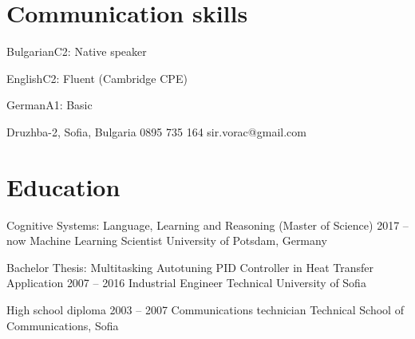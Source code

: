 \documentclass{tccv}
\begin{document}
\section{Communication skills}
\begin{factlist}
\item{Bulgarian}{C2: Native speaker}
\item{English}{C2: Fluent (Cambridge CPE)}
\item{German}{A1: Basic}
\end{factlist}


\personal
    {Druzhba-2, Sofia, Bulgaria}
    {0895 735 164}
    {sir.vorac@gmail.com}


\section{Education}
\begin{yearlist}
\item[{\footnotesize Cognitive Systems: Language, Learning and Reasoning
(Master of
Science)}]
     {2017 -- now}
     {Machine Learning Scientist}
     {University of Potsdam, Germany}

\item[Bachelor Thesis:                 \newline
     {\footnotesize Multitasking Autotuning PID Controller in Heat Transfer Application}]
     {2007 -- 2016}
     {Industrial Engineer}
     {Technical University of Sofia}

\item[High school diploma]{2003 -- 2007}
     {Communications technician}
     {Technical School of Communications, Sofia}
\end{yearlist}


\newpage
\end{document}
